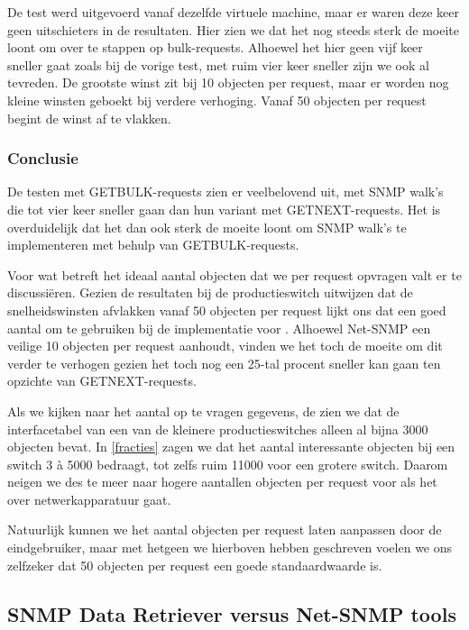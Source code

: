 De test werd uitgevoerd vanaf dezelfde virtuele machine, maar er waren deze keer geen uitschieters in de resultaten.
Hier zien we dat het nog steeds sterk de moeite loont om over te stappen op bulk-requests.
Alhoewel het hier geen vijf keer sneller gaat zoals bij de vorige test, met ruim vier keer sneller zijn we ook al tevreden.
De grootste winst zit bij 10 objecten per request, maar er worden nog kleine winsten geboekt bij verdere verhoging.
Vanaf 50 objecten per request begint de winst af te vlakken.

\subsubsection{Conclusie}

De testen met GETBULK-requests zien er veelbelovend uit, met SNMP walk's die tot vier keer sneller gaan dan hun variant met GETNEXT-requests.
Het is overduidelijk dat het dan ook sterk de moeite loont om SNMP walk's te implementeren met behulp van GETBULK-requests.

Voor wat betreft het ideaal aantal objecten dat we per request opvragen valt er te discussiëren.
Gezien de resultaten bij de productieswitch uitwijzen dat de snelheidswinsten afvlakken vanaf 50 objecten per request lijkt ons dat een goed aantal
om te gebruiken bij de implementatie voor \nwmretriever.
Alhoewel Net-SNMP een veilige 10 objecten per request aanhoudt,
vinden we het toch de moeite om dit verder te verhogen gezien het toch nog een 25-tal procent sneller kan gaan ten opzichte van GETNEXT-requests.

Als we kijken naar het aantal op te vragen gegevens, de zien we dat de interfacetabel van een van de kleinere productieswitches alleen al bijna 3000 objecten bevat.
In \cref{fracties} zagen we dat het aantal interessante objecten bij een switch 3 à 5000 bedraagt, tot zelfs ruim 11000 voor een grotere switch.
Daarom neigen we des te meer naar hogere aantallen objecten per request voor als het over netwerkapparatuur gaat.

Natuurlijk kunnen we het aantal objecten per request laten aanpassen door de eindgebruiker,
maar met hetgeen we hierboven hebben geschreven voelen we ons zelfzeker dat 50 objecten per request een goede standaardwaarde is.




\subsection{SNMP Data Retriever versus Net-SNMP tools}


